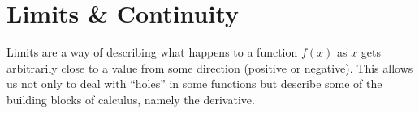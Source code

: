 \chapter{Limits \& Continuity}

Limits are a way of describing what happens to a function $f(x)$ as $x$ gets arbitrarily close to a value from some direction (positive or negative).
This allows us not only to deal with ``holes'' in some functions but describe some of the building blocks of calculus, namely the derivative.









